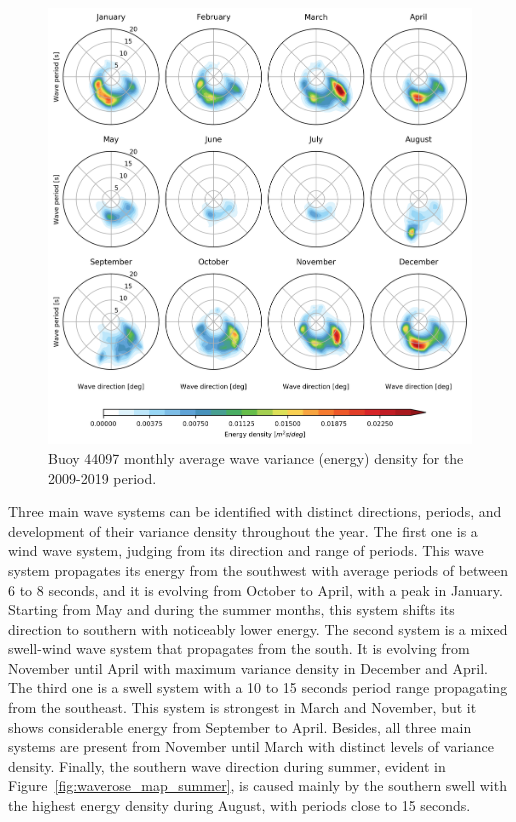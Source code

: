  \begin{figure}[H]
\centering
\includegraphics[width=0.95\linewidth]{Figures/Chapter5/monthly_dir_spectra.png}
\caption{Buoy 44097 monthly average wave variance (energy) density for the 2009-2019 period.}
\label{fig:monthly_dir_spectra}
\end{figure}


Three main wave systems can be identified with distinct directions, periods, and development of their variance density throughout the year. The first one is a wind wave system, judging from its direction and range of periods. This wave system propagates its energy from the southwest with average periods of between 6 to 8 seconds, and it is evolving from October to April, with a peak in January. Starting from May and during the summer months, this system shifts its direction to southern with noticeably lower energy. The second system is a mixed swell-wind wave system that propagates from the south. It is evolving from November until April with maximum variance density in December and April. The third one is a swell system with a 10 to 15 seconds period range propagating from the southeast. This system is strongest in March and November, but it shows considerable energy from September to April. Besides, all three main systems are present from November until March with distinct levels of variance density. Finally, the southern wave direction during summer, evident in Figure~\ref{fig:waverose_map_summer}, is caused mainly by the southern swell with the highest energy density during August, with periods close to 15 seconds.




